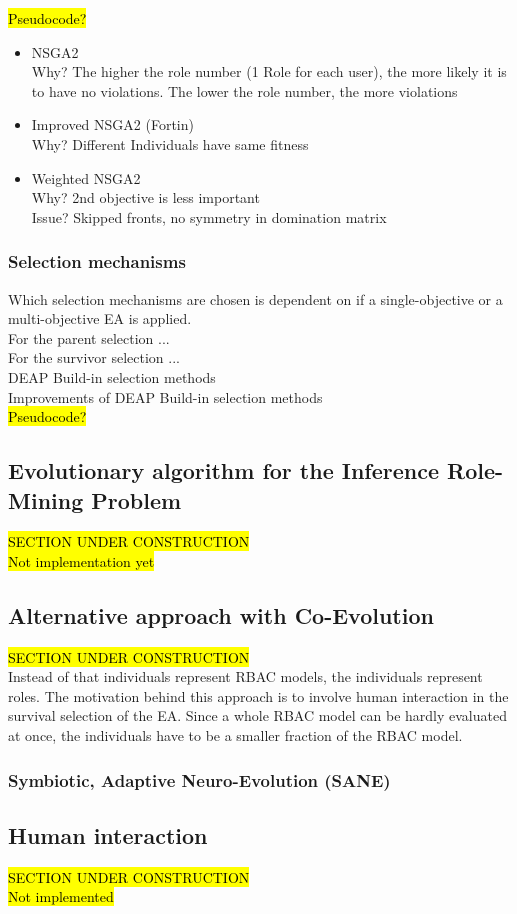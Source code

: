     \hl{Pseudocode?}
    
    \begin{itemize}
        \item NSGA2\\
        Why? The higher the role number (1 Role for each user), the more likely it is to have no violations. The lower the role number, the more violations
        \item Improved NSGA2 (Fortin)\\
        Why? Different Individuals have same fitness
        \item Weighted NSGA2\\
        Why? 2nd objective is less important\\
        Issue? Skipped fronts, no symmetry in domination matrix
    \end{itemize}
        
    \subsubsection{Selection mechanisms}
    Which selection mechanisms are chosen is dependent on if a single-objective or a multi-objective EA is applied.\\
    For the parent selection ...\\
    For the survivor selection ...\\
    DEAP Build-in selection methods\\
    Improvements of DEAP Build-in selection methods\\
    \hl{Pseudocode?}
    
\subsection{Evolutionary algorithm for the Inference Role-Mining Problem}
\hl{SECTION UNDER CONSTRUCTION}\\
\hl{Not implementation yet}

\subsection{Alternative approach with Co-Evolution}
\hl{SECTION UNDER CONSTRUCTION}\\
Instead of that individuals represent RBAC models, the individuals represent roles. The motivation behind this approach is to involve human interaction in the survival selection of the EA. Since a whole RBAC model can be hardly evaluated at once, the individuals have to be a smaller fraction of the RBAC model.

    \subsubsection{Symbiotic, Adaptive Neuro-Evolution (SANE)}

\subsection{Human interaction}
\hl{SECTION UNDER CONSTRUCTION}\\
\hl{Not implemented}
